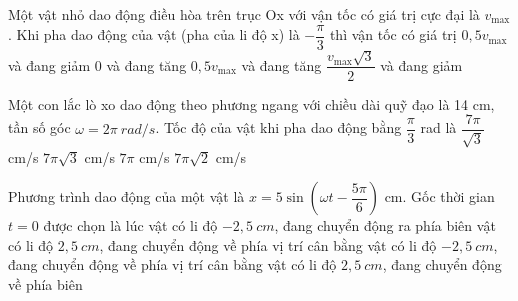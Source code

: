 \begin{ex}%
Một vật nhỏ dao động điều hòa trên trục Ox với vận tốc có giá trị cực đại là $v_{\max}$. Khi pha dao động của vật (pha của li độ x) là  $-\dfrac{\pi}{3}$  thì vận tốc có giá trị
\choice
{$0,5v_{\max}$ và đang giảm}
{$0$ và đang tăng}
{$0,5v_{\max}$ và đang tăng}
{\True $\dfrac{{{v}_{\max }}\sqrt{3}}{2}$ và đang giảm}
\end{ex} 
\begin{ex}%
Một con lắc lò xo dao động theo phương ngang với chiều dài quỹ đạo là 14 cm, tần số góc $\omega =2\pi \ rad/s$. Tốc độ của vật khi pha dao động bằng $\dfrac{\pi }{3}$ rad là
\choice
{$\dfrac{{7\pi }}{{\sqrt{3}}}$ cm/s}
{\True $7\pi \sqrt{3}$ cm/s}
{$7\pi $ cm/s}
{$7\pi \sqrt{2}$ cm/s}
\end{ex} 
\begin{ex}%
Phương trình dao động của một vật là $x=5\sin \left(\omega t-\dfrac{5\pi}{6}\right)$ cm. Gốc thời gian $t = 0$ được chọn là lúc
\choice
{\True vật có li độ $- 2,5\ cm$, đang chuyển động ra phía biên}
{vật có li độ $2,5\ cm$, đang chuyển động về phía vị trí cân bằng}
{vật có li độ $-2,5\ cm$, đang chuyển động về phía vị trí cân bằng}
{vật có li độ $2,5\ cm$, đang chuyển động về phía biên}
\end{ex} 

